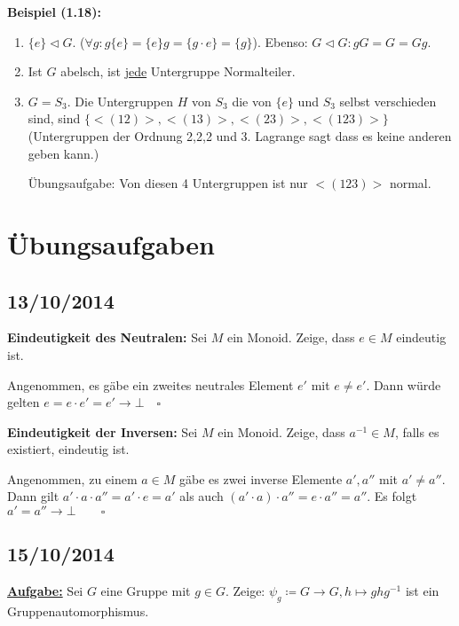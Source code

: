 \documentclass[10pt,a4paper]{article}
\begin{document}
\textbf{Beispiel (1.18):}\begin{enumerate}
\item $\{ e \} \triangleleft G$. ($ \forall g: g \{ e \} = \{ e \} g = \{ g \cdot e \} = \{ g \}$). Ebenso: $G \triangleleft G: gG = G = Gg$.
\item Ist $G$ abelsch, ist \underline{jede} Untergruppe Normalteiler. 
\item $G = S_3$. Die Untergruppen $H$ von $S_3$ die von $\{e\}$ und $S_3$ selbst verschieden sind, sind $\{<(12)>, <(13)>, <(23)>, <(123)>\}$ (Untergruppen der Ordnung 2,2,2 und 3. Lagrange sagt dass es keine anderen geben kann.)

Übungsaufgabe: Von diesen 4 Untergruppen ist nur $<(123)>$ normal.
\end{enumerate}


\newpage
\section{Übungsaufgaben}

\subsection{13/10/2014}

\textbf{Eindeutigkeit des Neutralen:} Sei $M$ ein Monoid. Zeige, dass $e \in M$ eindeutig ist.\bigskip

Angenommen, es gäbe ein zweites neutrales Element $e'$ mit $e \neq e'$. Dann würde gelten $e = e \cdot e' = e' \rightarrow \bot \quad \square$\bigskip

\textbf{Eindeutigkeit der Inversen:} Sei $M$ ein Monoid. Zeige, dass $a^{-1} \in M$, falls es existiert, eindeutig ist.\bigskip

Angenommen, zu einem $a \in M$ gäbe es zwei inverse Elemente $a', a''$ mit $a' \neq a''$. Dann gilt $a' \cdot a \cdot a''= a' \cdot e = a'$ als auch $(a' \cdot a) \cdot a'' = e \cdot a'' = a''$. Es folgt $a' = a'' \rightarrow \bot \qquad \square$

\subsection{15/10/2014}

\textbf{\underline{Aufgabe:}} Sei $G$ eine Gruppe mit $g \in G$. Zeige: $\psi_g \coloneqq G \to G, h \mapsto g h g^{-1}$ ist ein Gruppenautomorphismus.
\end{document}
